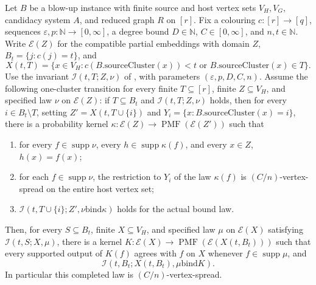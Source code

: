 \begin{lemma}
Let $B$ be a blow-up instance with finite source and host vertex sets $V_H,V_G$,
candidacy system $A$, and reduced graph $R$ on $[r]$.  Fix a colouring
$c:[r]\to[q]$, sequences $\varepsilon,p:\mathbb N\to[0,\infty]$, a degree
bound $D\in\mathbb N$, $C\in[0,\infty]$, and $n,t\in\mathbb N$.
Write $\mathcal E(Z)$ for the compatible partial embeddings with domain $Z$,
$B_t=\{j:c(j)=t\}$, and
\[
 X(t,T)=\{x\in V_H:c(B.\mathrm{sourceCluster}(x))<t
                     \text{ or }B.\mathrm{sourceCluster}(x)\in T\}.
\]
Use the invariant $\mathcal I(t,T;Z,\nu)$ of
, with parameters $(\varepsilon,p,D,C,n)$.
Assume the following one-cluster transition for every finite $T\subseteq[r]$,
finite $Z\subseteq V_H$, and specified law $\nu$ on $\mathcal E(Z)$:
if $T\subseteq B_t$ and $\mathcal I(t,T;Z,\nu)$ holds, then for every
$i\in B_t\setminus T$, setting $Z'=X(t,T\cup\{i\})$ and
$Y_i=\{x:B.\mathrm{sourceCluster}(x)=i\}$, there is a probability kernel
$\kappa:\mathcal E(Z)\to\operatorname{PMF}(\mathcal E(Z'))$ such that
\begin{enumerate}
\item for every $f\in\operatorname{supp}\nu$, every
$h\in\operatorname{supp}\kappa(f)$, and every $x\in Z$, $h(x)=f(x)$;
\item for each $f\in\operatorname{supp}\nu$, the restriction to $Y_i$ of the
law $\kappa(f)$ is $(C/n)$-vertex-spread on the entire host vertex set;
\item $\mathcal I(t,T\cup\{i\};Z',\nu\mathbin{\mathrm{bind}}\kappa)$ holds
for the actual bound law.
\end{enumerate}
Then, for every $S\subseteq B_t$, finite $X\subseteq V_H$, and specified
law $\mu$ on $\mathcal E(X)$ satisfying $\mathcal I(t,S;X,\mu)$,
there is a kernel
$K:\mathcal E(X)\to\operatorname{PMF}(\mathcal E(X(t,B_t)))$ such that
every supported output of $K(f)$ agrees with $f$ on $X$ whenever
$f\in\operatorname{supp}\mu$, and
\[
 \mathcal I(t,B_t;X(t,B_t),\mu\mathbin{\mathrm{bind}}K).
\]
In particular this completed law is $(C/n)$-vertex-spread.
\end{lemma}
